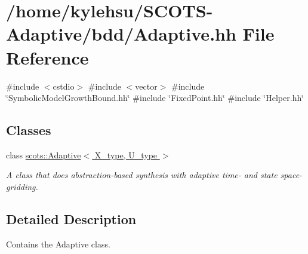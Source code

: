 \hypertarget{Adaptive_8hh}{}\section{/home/kylehsu/\+S\+C\+O\+T\+S-\/\+Adaptive/bdd/\+Adaptive.hh File Reference}
\label{Adaptive_8hh}
{\ttfamily \#include $<$cstdio$>$}\newline
{\ttfamily \#include $<$vector$>$}\newline
{\ttfamily \#include \char`\"{}Symbolic\+Model\+Growth\+Bound.\+hh\char`\"{}}\newline
{\ttfamily \#include \char`\"{}Fixed\+Point.\+hh\char`\"{}}\newline
{\ttfamily \#include \char`\"{}Helper.\+hh\char`\"{}}\newline
\subsection*{Classes}
\begin{DoxyCompactItemize}
\item 
class \hyperlink{classscots_1_1Adaptive}{scots\+::\+Adaptive$<$ X\+\_\+type, U\+\_\+type $>$}
\begin{DoxyCompactList}\small\item\em A class that does abstraction-\/based synthesis with adaptive time-\/ and state space-\/gridding. \end{DoxyCompactList}\end{DoxyCompactItemize}


\subsection{Detailed Description}
Contains the Adaptive class. 
